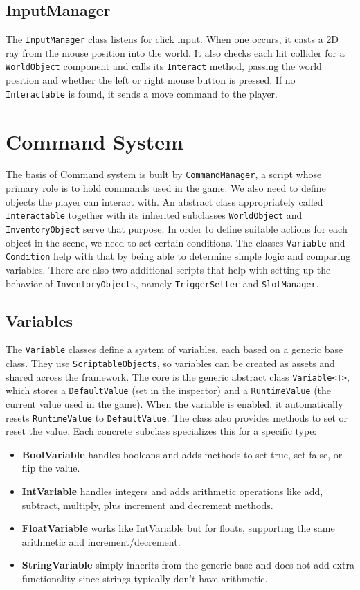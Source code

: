 \subsection{InputManager}
The \verb|InputManager| class listens for click input. When one occurs, it casts a 2D ray from the mouse position into the world. It also checks each hit collider for a \verb|WorldObject| component and calls its \verb|Interact| method, passing the world position and whether the left or right mouse button is pressed. If no \verb|Interactable| is found, it sends a move command to the player.

\section{Command System}
\label{CommandSystem}
The basis of Command system is built by \verb|CommandManager|, a script whose primary role is to hold commands used in the game. We also need to define objects the player can interact with.  An abstract class appropriately called \verb|Interactable| together with its inherited subclasses \verb|WorldObject| and \verb|InventoryObject| serve that purpose. In order to define suitable actions for each object in the scene, we need to set certain conditions. The classes \verb|Variable| and \verb|Condition| help with that by being able to determine simple logic and comparing variables. There are also two additional scripts that help with setting up the behavior of \verb|InventoryObjects|, namely \verb|TriggerSetter| and \verb|SlotManager|.

\subsection{Variables}
The \verb|Variable| classes define a system of variables, each based on a generic base class. They use \verb|ScriptableObjects|, so variables can be created as assets and shared across the framework. The core is the generic abstract class \verb|Variable<T>|, which stores a \verb|DefaultValue| (set in the inspector) and a \verb|RuntimeValue| (the current value used in the game). When the variable is enabled, it automatically resets \verb|RuntimeValue| to \verb|DefaultValue|. The class also provides methods to set or reset the value. Each concrete subclass specializes this for a specific type:

\begin{itemize}
    \item \textbf{BoolVariable} handles booleans and adds methods to set true, set false, or flip the value.
    \item \textbf{IntVariable} handles integers and adds arithmetic operations like add, subtract, multiply, plus increment and decrement methods.
    \item \textbf{FloatVariable} works like IntVariable but for floats, supporting the same arithmetic and increment/decrement.
    \item \textbf{StringVariable} simply inherits from the generic base and does not add extra functionality since strings typically don't have arithmetic.
\end{itemize}

